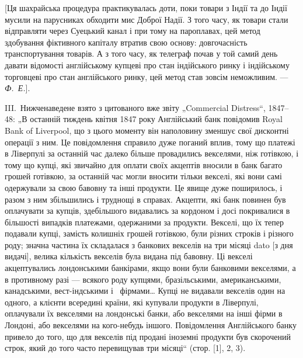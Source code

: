 
[Ця шахрайська процедура практикувалась доти, поки товари з Індії та до
Індії мусили на парусниках обходити мис Доброї Надії. З того часу, як товари
стали відправляти через Суецький канал і при тому на пароплавах, цей метод
здобування фіктивного капіталу втратив свою основу: довгочасність транспортування товарів. А з того
часу, як телеграф почав у той самий день давати відомості англійському купцеві про стан індійського
ринку і індійському торговцеві про стан англійського ринку, цей метод став зовсім неможливим. — \emph{Ф.~Е.}].

III.~Нижченаведене взято з цитованого вже звіту „Commercial Distress“,
1847--48: „В останній тиждень квітня 1847 року Англійський банк повідомив
Royal Bank of Liverpool, що з цього моменту він наполовину зменшує свої дисконтні операції з ним. Це
повідомлення справило дуже поганий вплив, тому
що платежі в Ліверпулі за останній час далеко більше провадились векселями,
ніж готівкою, і тому що купці, які звичайно для оплати своїх акцептів вносили
в банк багато грошей готівкою, за останній час могли вносити тільки векселі,
які вони самі одержували за свою бавовну та інші продукти. Це явище дуже
поширилось, і разом з ним збільшились і труднощі в справах. Акцепти, які
банк повинен був оплачувати за купців, здебільшого видавались за кордоном
і досі покривалися в більшості випадків платежами, одержаними за продукти. Векселі, що їх тепер
подавали купці, замість колишніх грошей готівкою, були
різних строків і різного роду; значна частина їх складалася з банкових векселів на три місяці dato
[з дня видачі], велика кількість векселів була видана
під бавовну. Ці векселі акцептувались лондонськими банкірами, якщо вони були
банковими векселями, а в противному разі — всякого роду купцями, бразільськими,
американськими, канадськими, вест-індськими і~ фірмами\dots{} Купці не видавали векселів один на
одного, а клієнти всередині країни, які купували продукти в Ліверпулі, оплачували їх векселями на
лондонські банки, або векселями на інші фірми в Лондоні, або векселями на кого-небудь іншого.
Повідомлення Англійського банку привело до того, що для векселів під продані іноземні продукти був
скорочений строк, який до того часто перевищував три місяці“ (стор. [1], 2, 3).

